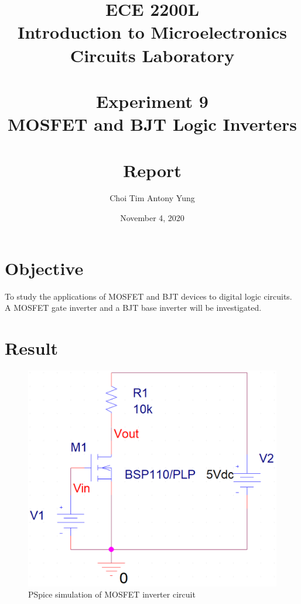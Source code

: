 \documentclass{article}
\title{ECE 2200L\\Introduction to Microelectronics Circuits Laboratory\\\,\\Experiment 9\\MOSFET and BJT Logic Inverters\\\,\\Report}
\author{Choi Tim Antony Yung}
\date{November 4, 2020}
\begin{document}
\maketitle

\thispagestyle{empty}
\setcounter{page}{0}

\newpage

\section*{Objective}
To study the applications of MOSFET and BJT devices to digital logic circuits.  A MOSFET gate inverter and a BJT base inverter will be investigated.

\section*{Result}

\begin{figure}[H]
  \centering
  \includegraphics[width=\textwidth]{ECE2200L_Lab9_PSpice_schematic_A.png}
  \caption{PSpice simulation of MOSFET inverter circuit}
  \label{fig:ckta}
\end{figure}
\end{document}
